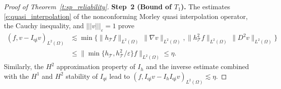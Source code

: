 \documentclass[a4paper]{amsart}
\theoremstyle{definition}
\numberwithin{equation}{section}
\numberwithin{theorem}{section}
\newcommand{\tri}{\mathcal{T}}
\newcommand{\ennorm}[1]{\lvert\!\lvert\!\lvert #1 \rvert\!\rvert\!\rvert}
\begin{document}
\begin{proof}[Proof of Theorem~\ref{t:sp_reliability}]
    \textbf{Step~2 (Bound of $T_1$).}
    The estimates 
    \eqref{e:quasi_interpolation}
    of the nonconforming Morley quasi interpolation operator,
    the Cauchy inequality, and $\ennorm{v}_{\varepsilon}=1$ 
    prove
    \begin{align*}
        (f,v-I_\mathrm{qi}v)_{L^2(\Omega)} 
        &\lesssim 
          \min\{\lVert h_\tri f \rVert_{L^2(\Omega)} \,
            \lVert \nabla v \rVert_{L^2(\Omega)},
             \lVert h_\tri^2 f \rVert_{L^2(\Omega)} \,
            \lVert D^2 v \rVert_{L^2(\Omega)}\}\\
        &\leq \lVert\min\{h_\tri,h_\tri^2/\varepsilon\}
           f \rVert_{L^2(\Omega)}
         \leq \eta.
    \end{align*}
    Similarly, the $H^2$ approximation property of $I_h$ and
    the inverse estimate combined with the $H^1$ and $H^2$ stability of 
    $I_{qi}$ lead to
    $
        (f, I_\mathrm{qi}v-I_hI_\mathrm{qi}v)_{L^2(\Omega)}
        \lesssim \eta.
    $
    

\end{proof}
\end{document}
